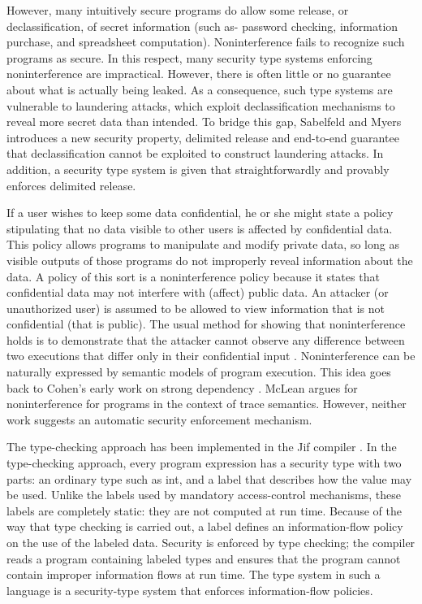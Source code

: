 However, many intuitively secure programs do allow some release, or declassification, of secret information (such as- password checking, information purchase, and spreadsheet computation). Noninterference fails to recognize such programs as secure. In this respect, many security type systems enforcing noninterference are impractical. However, there is often little or no guarantee about what is actually being leaked. As a consequence, such type systems are vulnerable to laundering attacks, which exploit declassification mechanisms to reveal more secret data than intended. To bridge this gap, Sabelfeld and Myers
\cite{ref_72_sabelfeld2004model} introduces a new security property, delimited release and end-to-end guarantee that declassification cannot be exploited to construct laundering attacks. In addition, a security type system is given that straightforwardly and provably enforces delimited release.

If a user wishes to keep some data confidential, he or
she might state a policy stipulating that no data visible
to other users is affected by confidential data. This policy
allows programs to manipulate and modify private data, so
long as visible outputs of those programs do not improperly
reveal information about the data. A policy of this sort is a
noninterference policy \cite{ref_65_goguen1982security} because it states that confidential
data may not interfere with (affect) public data. An attacker (or unauthorized user) is assumed to be allowed
to view information that is not confidential (that is public).
The usual method for showing that noninterference holds is
to demonstrate that the attacker cannot observe any difference
between two executions that differ only in their confidential
input \cite{ref_66_goguen1984unwinding}. Noninterference can be naturally expressed by
semantic models of program execution. This idea goes back
to Cohen's early work on strong dependency \cite{ref_67_cohen1977information,ref_68_cohen1978information}.
McLean \cite{ref_69_mclean1992proving} argues for noninterference for programs in the
context of trace semantics. However, neither work suggests an
automatic security enforcement mechanism.

The type-checking approach has been implemented
in the Jif compiler \cite{ref_48_chong:jif,ref_40_myers:jflow}.
In the type-checking approach, every program expression
has a security type with two parts: an ordinary type such as int,
and a label that describes how the value may be used. Unlike
the labels used by mandatory access-control mechanisms,
these labels are completely static: they are not computed at
run time. Because of the way that type checking is carried
out, a label defines an information-flow policy on the use of
the labeled data. Security is enforced by type checking; the
compiler reads a program containing labeled types and ensures that the program cannot contain
improper information flows at run time. The type system
in such a language is a security-type system that enforces
information-flow policies.

